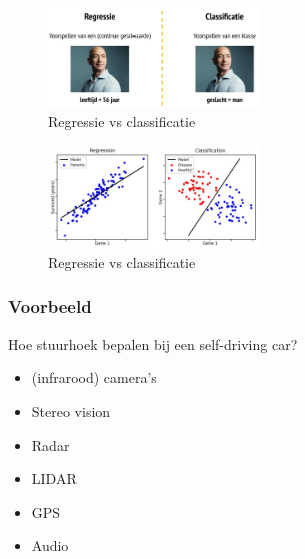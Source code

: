 \documentclass{article}
\begin{document}
\begin{figure}[H]
    \centering
    \includegraphics[width=0.5\textwidth]{regressie-vs-classificatie.png}
    \caption{Regressie vs classificatie}
\end{figure}

\begin{figure}[H]
    \centering
    \includegraphics[width=0.5\textwidth]{regressie-vs-classificatie2.png}
    \caption{Regressie vs classificatie}
\end{figure}

\subsubsection{Voorbeeld}

Hoe stuurhoek bepalen bij een self-driving car?

\begin{itemize}
    \item (infrarood) camera's
    \item Stereo vision
    \item Radar
    \item LIDAR
    \item GPS
    \item Audio
\end{itemize}
\end{document}
